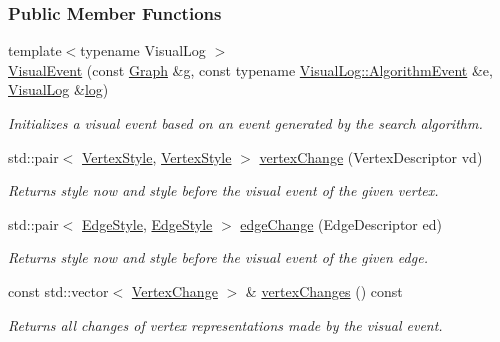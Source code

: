 \subsubsection*{Public Member Functions}
\begin{DoxyCompactItemize}
\item 
{\footnotesize template$<$typename Visual\+Log $>$ }\\\hyperlink{structVisualEvent_ace506f744185e80743b8c30485c453c9}{Visual\+Event} (const \hyperlink{structStateGraph}{Graph} \&g, const typename \hyperlink{structVisualLog_a90bc804c23c7d24b7857d8f79c46afbb}{Visual\+Log\+::\+Algorithm\+Event} \&e, \hyperlink{structVisualLog}{Visual\+Log} \&\hyperlink{algorithm__log_8h_a56be41e5d18609f6adf769e9c49804da}{log})
\begin{DoxyCompactList}\small\item\em Initializes a visual event based on an event generated by the search algorithm. \end{DoxyCompactList}\item 
std\+::pair$<$ \hyperlink{structVisualEvent_aa9a4b26fbfd3265493496f18a5495022}{Vertex\+Style}, \hyperlink{structVisualEvent_aa9a4b26fbfd3265493496f18a5495022}{Vertex\+Style} $>$ \hyperlink{structVisualEvent_ab0da10169ecd86c8e9bf6e377f277655}{vertex\+Change} (Vertex\+Descriptor vd)
\begin{DoxyCompactList}\small\item\em Returns style now and style before the visual event of the given vertex. \end{DoxyCompactList}\item 
std\+::pair$<$ \hyperlink{structVisualEvent_ab4aa8ae73e19b337c7f23b39ff9acabf}{Edge\+Style}, \hyperlink{structVisualEvent_ab4aa8ae73e19b337c7f23b39ff9acabf}{Edge\+Style} $>$ \hyperlink{structVisualEvent_a2cbf99e2394e11a1b113bed954dd6053}{edge\+Change} (Edge\+Descriptor ed)
\begin{DoxyCompactList}\small\item\em Returns style now and style before the visual event of the given edge. \end{DoxyCompactList}\item 
const std\+::vector$<$ \hyperlink{structVisualEvent_1_1VertexChange}{Vertex\+Change} $>$ \& \hyperlink{structVisualEvent_adad3edf3951e76c376fe2eccea28c4ca}{vertex\+Changes} () const 
\begin{DoxyCompactList}\small\item\em Returns all changes of vertex representations made by the visual event. \end{DoxyCompactList}\item 

\end{DoxyCompactItemize}
